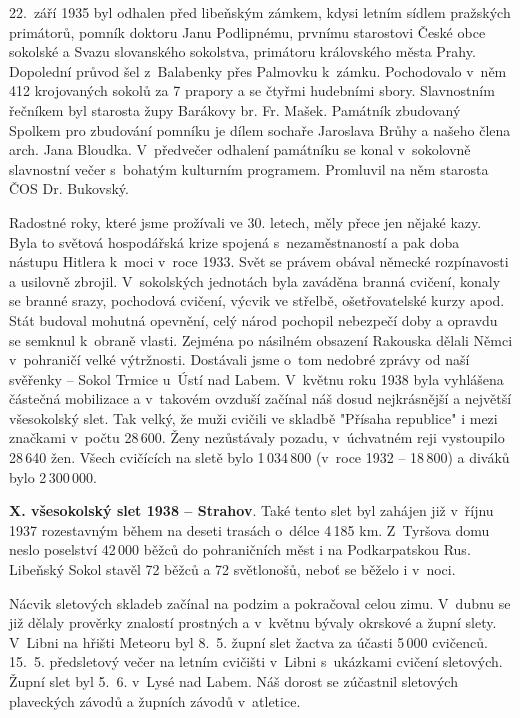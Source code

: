 \documentclass[a5paper, 11pt, twoside]{article}
\begin{document}
22.~září 1935 byl odhalen před libeňským zámkem, kdysi letním sídlem
pražských primátorů, pomník doktoru Janu Podlipnému, prvnímu starostovi
České obce sokolské a Svazu slovanského sokolstva, primátoru královského
města Prahy. Dopolední průvod šel z~Balabenky přes Palmovku k~zámku.
Pochodovalo v~něm 412 krojovaných sokolů za 7 prapory a se čtyřmi
hudebními sbory. Slavnostním řečníkem byl starosta župy Barákovy br. Fr.
Mašek. Památník zbudovaný Spolkem pro zbudování pomníku je dílem sochaře
Jaroslava Brůhy a našeho člena arch. Jana Bloudka. V~předvečer odhalení
památníku se konal v~sokolovně slavnostní večer s~bohatým kulturním
programem. Promluvil na něm starosta ČOS Dr. Bukovský.

Radostné roky, které jsme prožívali ve 30. letech, měly přece jen nějaké
kazy. Byla to světová hospodářská krize spojená s~nezaměstnaností a pak
doba nástupu Hitlera k~moci v~roce 1933. Svět se právem obával německé
rozpínavosti a usilovně zbrojil. V~sokolských jednotách byla zaváděna
branná cvičení, konaly se branné srazy, pochodová cvičení, výcvik ve
střelbě, ošetřovatelské kurzy apod. Stát budoval mohutná opevnění, celý
národ pochopil nebezpečí doby a opravdu se semknul k~obraně vlasti.
Zejména po násilném obsazení Rakouska dělali Němci v~pohraničí velké
výtržnosti. Dostávali jsme o~tom nedobré zprávy od naší svěřenky --
Sokol Trmice u~Ústí nad Labem. V~květnu roku 1938 byla vyhlášena
částečná mobilizace a v~takovém ovzduší začínal náš dosud nejkrásnější a
největší všesokolský slet. Tak velký, že muži cvičili ve skladbě
"Přísaha republice" i mezi značkami v~počtu 28\,600. Ženy nezůstávaly
pozadu, v~úchvatném reji vystoupilo 28\,640 žen. Všech cvičících na sletě
bylo 1\,034\,800 (v~roce 1932 -- 18\,800) a diváků bylo 2\,300\,000.

\textbf{X. všesokolský slet 1938 -- Strahov}. Také tento slet byl zahájen již v~říjnu 1937 rozestavným během na deseti
trasách o~délce 4\,185 km. Z~Tyršova domu neslo poselství 42\,000 běžců do
pohraničních měst i na Podkarpatskou Rus. Libeňský Sokol stavěl 72 běžců
a 72 světlonošů, neboť se běželo i v~noci.

{\sloppy Nácvik sletových skladeb začínal na podzim a pokračoval celou zimu.
V~dubnu se již dělaly prověrky znalostí prostných a v~květnu bývaly
okrskové a župní slety. V~Libni na hřišti Meteoru byl 8.~5. župní slet
žactva za účasti 5\,000 cvičenců. 15.~5. předsletový večer na letním
cvičišti v~Libni s~ukázkami cvičení sletových. Župní slet byl 5.~6.
v~Lysé nad Labem. Náš dorost se zúčastnil sletových plaveckých závodů a
župních závodů v~atletice. \par}
\end{document}
